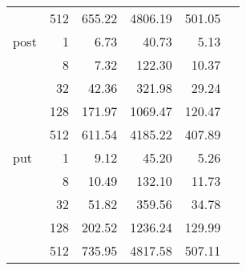 \begin{table}[!htp]
\begin{tabular}{lrrrrr}
                        & 512         & 655.22   & 4806.19  & 501.05  \\
        post            & 1           & 6.73     & 40.73    & 5.13    \\
                        & 8           & 7.32     & 122.30   & 10.37   \\
                        & 32          & 42.36    & 321.98   & 29.24   \\
                        & 128         & 171.97   & 1069.47  & 120.47  \\
                        & 512         & 611.54   & 4185.22  & 407.89  \\
        put             & 1           & 9.12     & 45.20    & 5.26    \\
                        & 8           & 10.49    & 132.10   & 11.73   \\
                        & 32          & 51.82    & 359.56   & 34.78   \\
                        & 128         & 202.52   & 1236.24  & 129.99  \\
                        & 512         & 735.95   & 4817.58  & 507.11  \\
        \bottomrule
    \end{tabular}
\end{table}
